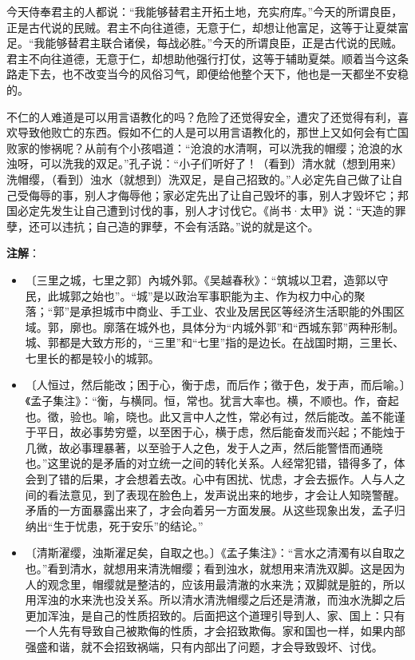 \documentclass[12pt,UTF-8,openany,a4]{ctexbook}
\begin{document}
\begin{large}
    今天侍奉君主的人都说：“我能够替君主开拓土地，充实府库。”今天的所谓良臣，正是古代说的民贼。君主不向往道德，无意于仁，却想让他富足，这等于让夏桀富足。“我能够替君主联合诸侯，每战必胜。”今天的所谓良臣，正是古代说的民贼。君主不向往道德，无意于仁，却想助他强行打仗，这等于辅助夏桀。顺着当今这条路走下去，也不改变当今的风俗习气，即便给他整个天下，他也是一天都坐不安稳的。
    
    不仁的人难道是可以用言语教化的吗？危险了还觉得安全，遭灾了还觉得有利，喜欢导致他败亡的东西。假如不仁的人是可以用言语教化的，那世上又如何会有亡国败家的惨祸呢？从前有个小孩唱道：“沧浪的水清啊，可以洗我的帽缨；沧浪的水浊呀，可以洗我的双足。”孔子说：“小子们听好了！（看到）清水就（想到用来）洗帽缨，（看到）浊水（就想到）洗双足，是自己招致的。”人必定先自己做了让自己受侮辱的事，别人才侮辱他；家必定先出了让自己毁坏的事，别人才毁坏它；邦国必定先发生让自己遭到讨伐的事，别人才讨伐它。《尚书·太甲》说：“天造的罪孽，还可以违抗；自己造的罪孽，不会有活路。”说的就是这个。
    

\end{large}


\newpage

\begin{Large}
   \noindent \textbf{注解}：
\end{Large}

\vspace{-1em}

\begin{itemize}
    \setlength\itemsep{-0.2em}
    \item〔三里之城，七里之郭〕{\yiwen 內城外郭。《吴越春秋》：“筑城以卫君，造郭以守民，此城郭之始也”。“城”是以政治军事职能为主、作为权力中心的聚落；“郭”是承担城市中商业、手工业、农业及居民区等经济生活职能的外围区域。郭，廓也。廓落在城外也，具体分为“内城外郭”和“西城东郭”两种形制。城、郭都是大致方形的，“三里”和“七里”指的是边长。在战国时期，三里长、七里长的都是较小的城郭。}
    \item〔人恒过，然后能改；困于心，衡于虑，而后作；徵于色，发于声，而后喻。〕{\yiwen 《孟子集注》：“衡，与横同。恒，常也。犹言大率也。横，不顺也。作，奋起也。徵，验也。喻，晓也。此又言中人之性，常必有过，然后能改。盖不能谨于平日，故必事势穷蹙，以至困于心，横于虑，然后能奋发而兴起；不能烛于几微，故必事理暴著，以至验于人之色，发于人之声，然后能警悟而通晓也。”这里说的是矛盾的对立统一之间的转化关系。人经常犯错，错得多了，体会到了错的后果，才会想着去改。心中有困扰、忧虑，才会去振作。人与人之间的看法意见，到了表现在脸色上，发声说出来的地步，才会让人知晓警醒。矛盾的一方面暴露出来了，才会向着另一方面发展。从这些现象出发，孟子归纳出“生于忧患，死于安乐”的结论。”}
    \item〔清斯濯缨，浊斯濯足矣，自取之也。〕{\yiwen 《孟子集注》：“言水之清濁有以自取之也。”看到清水，就想用来清洗帽缨；看到浊水，就想用来清洗双脚。这是因为人的观念里，帽缨就是整洁的，应该用最清澈的水来洗；双脚就是脏的，所以用浑浊的水来洗也没关系。所以清水清洗帽缨之后还是清澈，而浊水洗脚之后更加浑浊，是自己的性质招致的。后面把这个道理引导到人、家、国上：只有一个人先有导致自己被欺侮的性质，才会招致欺侮。家和国也一样，如果内部强盛和谐，就不会招致祸端，只有内部出了问题，才会导致毁坏、讨伐。}
\end{itemize}
\end{document}
